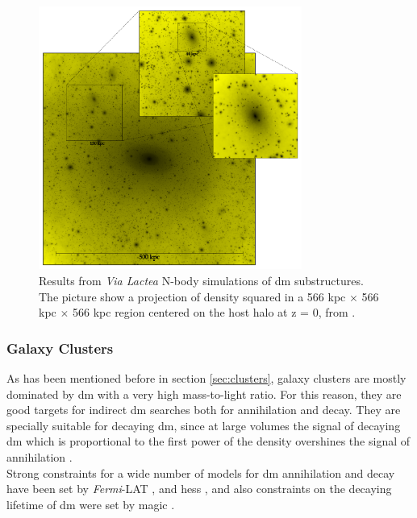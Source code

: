 \documentclass[main.tex]{subfiles}
\begin{document}
\begin{figure}
\centering
 \includegraphics[width=0.77\textwidth]{Pictures/DMsubhalos.pdf}
  \caption{Results from \textit{Via Lactea} N-body simulations of \gls{dm} substructures. The picture show a projection of density squared in a 566 kpc $\times$ 566 kpc $\times$ 566 kpc region centered on the host halo at z = 0, from \cite{2008DMhalossubhalosDSphe}.}
    \label{fig:DMstructhalos}
\end{figure}

\subsubsection{Galaxy Clusters}

As has been mentioned before in section \ref{sec:clusters}, galaxy clusters are mostly dominated by \gls{dm} with a very high mass-to-light ratio. For this reason, they are good targets for indirect \gls{dm}  searches both for annihilation and decay. They are specially suitable for decaying \gls{dm}, since at large volumes the signal of decaying \gls{dm} which is proportional to the first power of the density overshines the signal of annihilation \cite{2012DecayingDMCirelli}.\\
Strong constraints for a wide number of models for \gls{dm} annihilation and decay have been set by \textit{Fermi}-LAT \cite{2012DMClustersDecayFermi}, \cite{2010DMClustersFermiAnnihilation} and \gls{hess} \cite{2012DMClustersHess}, and also constraints on the decaying lifetime of \gls{dm} were set by \gls{magic} \cite{2018DMClustersMAGIC}. 
\end{document}
